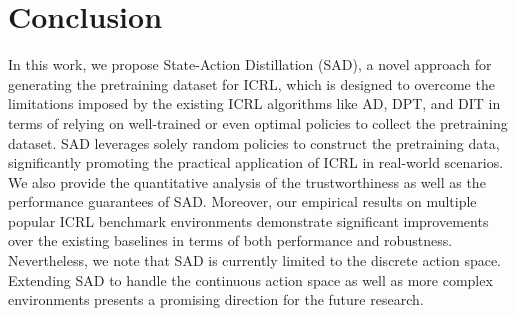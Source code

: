 %
%
\section{Conclusion}




In this work, we propose State-Action Distillation (SAD), a novel approach for generating the pretraining dataset for ICRL, which is designed to overcome the limitations imposed by the existing ICRL algorithms like AD, DPT, and DIT in terms of relying on well-trained or even optimal policies to collect the pretraining dataset. 
%
SAD leverages solely random policies to construct the pretraining data, significantly promoting the practical application of ICRL in real-world scenarios. 
%
We also provide the quantitative analysis of the trustworthiness as well as the performance guarantees of SAD. Moreover, our empirical results on multiple popular ICRL benchmark environments demonstrate significant improvements over the existing baselines in terms of both performance and robustness.
%
Nevertheless, we note that SAD is currently limited to the discrete action space. Extending SAD to handle the continuous action space as well as more complex environments presents a promising direction for the future research.





